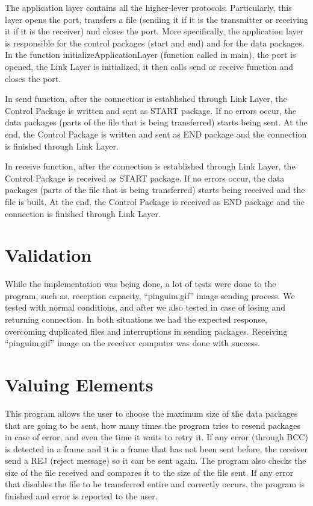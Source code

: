 \documentclass[a4paper]{article}
\begin{document}
The application layer contains all the higher-lever protocols. Particularly, this layer opens the port, transfers a file (sending it if it is the transmitter or receiving it if it is the receiver) and closes the port. More specifically, the application layer is responsible for the control packages (start and end) and for the data packages. In the function initializeApplicationLayer (function called in main), the port is opened, the Link Layer is initialized, it then calls send or receive function and closes the port.

In send function, after the connection is established through Link Layer, the Control Package is written and sent as START package. If no errors occur, the data packages (parts of the file that is being transferred) starts being sent. At the end, the Control Package is written and sent as END package and the connection is finished through Link Layer.

In receive function, after the connection is established through Link Layer, the Control Package is received as START package. If no errors occur, the data packages (parts of the file that is being transferred) starts being received and the file is built. At the end, the Control Package is received as END package and the connection is finished through Link Layer.

\section{Validation}

While the implementation was being done, a lot of tests were done to the program, such as, reception capacity, “pinguim.gif” image sending process. We tested with normal conditions, and after we also tested in case of losing and returning connection. In both situations we had the expected response, overcoming duplicated files and
interruptions in sending packages. Receiving “pinguim.gif” image on the receiver computer was done with success.

\section{Valuing Elements}

This program allows the user to choose the maximum size of the data packages that are going to be sent, how many times the program tries to resend packages in case of error, and even the time it waits to retry it. If any error (through BCC) is detected in a frame and it is a frame that has not been sent before, the receiver send a REJ (reject message) so it can be sent again. The program also checks the size of the file received and compares it to the size of the file sent. If any error that disables the file to be transferred entire and correctly occurs, the program is finished and error is reported to the user.
\end{document}
